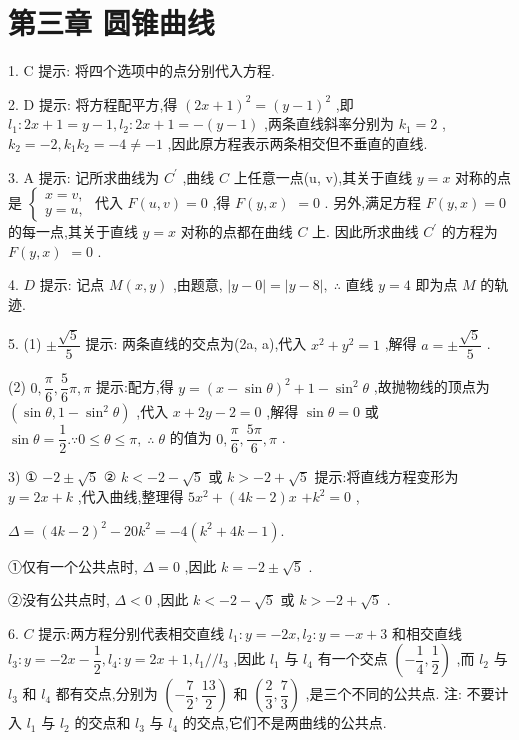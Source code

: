 \section*{第三章 圆锥曲线}

1. C 提示: 将四个选项中的点分别代入方程.

2. D 提示: 将方程配平方,得 ${\left( 2x + 1\right) }^{2} = {\left( y - 1\right) }^{2}$ ,即 ${l}_{1} : {2x} + 1 = y - 1,{l}_{2} : {2x} + 1 =  - \left( {y - 1}\right)$ ,两条直线斜率分别为 ${k}_{1} = 2$ , ${k}_{2} =  - 2,{k}_{1}{k}_{2} =  - 4 \neq   - 1$ ,因此原方程表示两条相交但不垂直的直线.

3. A 提示: 记所求曲线为 ${C}^{\prime }$ ,曲线 $C$ 上任意一点(u, v),其关于直线 $y = x$ 对称的点是 $\left\{  \begin{array}{l} x = v, \\  y = u, \end{array}\right.$ 代入 $F\left( {u,v}\right)  = 0$ ,得 $F\left( {y,x}\right)$  $= 0$ . 另外,满足方程 $F\left( {y,x}\right)  = 0$ 的每一点,其关于直线 $y = x$ 对称的点都在曲线 $C$ 上. 因此所求曲线 ${C}^{\prime }$ 的方程为 $F\left( {y,x}\right)$  $= 0$ .

4. $D$ 提示: 记点 $M\left( {x,y}\right)$ ,由题意, $\left| {y - 0}\right|  = \left| {y - 8}\right| ,\;\therefore$ 直线 $y = 4$ 即为点 $M$ 的轨迹.

5. (1) $\pm  \dfrac{\sqrt{5}}{5}$ 提示: 两条直线的交点为(2a, a),代入 ${x}^{2} + {y}^{2} = 1$ ,解得 $a =  \pm  \dfrac{\sqrt{5}}{5}$ .

(2) $0,\dfrac{\pi }{6},\dfrac{5}{6}\pi ,\pi$ 提示:配方,得 $y = {\left( x - \sin \theta \right) }^{2} + 1 - {\sin }^{2}\theta$ ,故抛物线的顶点为 $\left( {\sin \theta ,1 - {\sin }^{2}\theta }\right)$ ,代入 $x + {2y} - 2 = 0$ ,解得 $\sin \theta  = 0$ 或 $\sin \theta  = \dfrac{1}{2}.\because 0 \leq  \theta  \leq  \pi ,\;\therefore \;\theta$ 的值为 $0,\dfrac{\pi }{6},\dfrac{5\pi }{6},\pi$ .

3) ① $- 2 \pm  \sqrt{5}$ ② $k <  - 2 - \sqrt{5}$ 或 $k >  - 2 + \sqrt{5}$ 提示:将直线方程变形为 $y = {2x} + k$ ,代入曲线,整理得 $5{x}^{2} + \left( {{4k} - 2}\right) x$  $+ {k}^{2} = 0$ ,

$\Delta  = {\left( 4k - 2\right) }^{2} - {20}{k}^{2} =  - 4\left( {{k}^{2} + {4k} - 1}\right) .$

①仅有一个公共点时, $\Delta  = 0$ ,因此 $k =  - 2 \pm  \sqrt{5}$ .

②没有公共点时, $\Delta  < 0$ ,因此 $k <  - 2 - \sqrt{5}$ 或 $k >  - 2 + \sqrt{5}$ .

6. $C$ 提示:两方程分别代表相交直线 ${l}_{1} : y =  - {2x},{l}_{2} : y =  - x + 3$ 和相交直线 ${l}_{3} : y =  - {2x} - \dfrac{1}{2},{l}_{4} : y = {2x} + 1,{l}_{1}//{l}_{3}$ ,因此 ${l}_{1}$ 与 ${l}_{4}$ 有一个交点 $\left( {-\dfrac{1}{4},\dfrac{1}{2}}\right)$ ,而 ${l}_{2}$ 与 ${l}_{3}$ 和 ${l}_{4}$ 都有交点,分别为 $\left( {-\dfrac{7}{2},\dfrac{13}{2}}\right)$ 和 $\left( {\dfrac{2}{3},\dfrac{7}{3}}\right)$ ,是三个不同的公共点. 注: 不要计入 ${l}_{1}$ 与 ${l}_{2}$ 的交点和 ${l}_{3}$ 与 ${l}_{4}$ 的交点,它们不是两曲线的公共点.

